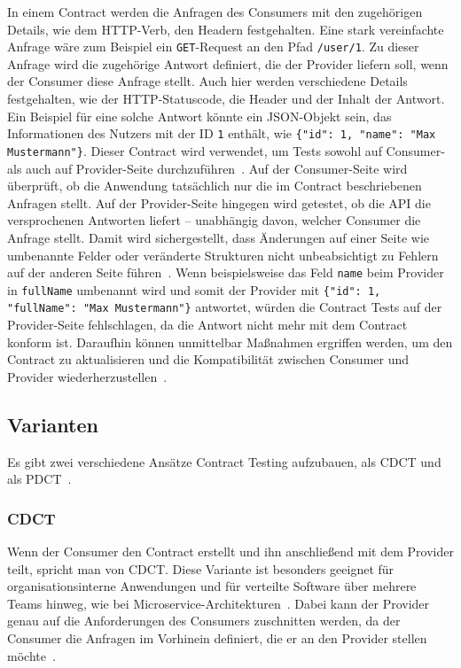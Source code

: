 In einem Contract werden die Anfragen des Consumers mit den zugehörigen Details, wie dem \gls{HTTP}-Verb, den Headern \usw festgehalten.
Eine stark vereinfachte Anfrage wäre zum Beispiel ein \texttt{GET}-Request an den Pfad \texttt{/user/1}.
Zu dieser Anfrage wird die zugehörige Antwort definiert, die der Provider liefern soll, wenn der Consumer diese Anfrage stellt.
Auch hier werden verschiedene Details festgehalten, wie der \gls{HTTP}-Statuscode, die Header und der Inhalt der Antwort.
Ein Beispiel für eine solche Antwort könnte ein \gls{JSON}-Objekt sein, das Informationen des Nutzers mit der ID \texttt{1} enthält, wie \zB \verb|{"id": 1, "name": "Max Mustermann"}|.
Dieser Contract wird verwendet, um Tests sowohl auf Consumer- als auch auf Provider-Seite durchzuführen~\cite{fowlerConsumerDrivenContractsService}.
Auf der Consumer-Seite wird überprüft, ob die Anwendung tatsächlich nur die im Contract beschriebenen Anfragen stellt.
Auf der Provider-Seite hingegen wird getestet, ob die \gls{API} die versprochenen Antworten liefert – unabhängig davon, welcher Consumer die Anfrage stellt.
Damit wird sichergestellt, dass Änderungen auf einer Seite wie \zB umbenannte Felder oder veränderte Strukturen nicht unbeabsichtigt zu Fehlern auf der anderen Seite führen~\cite{cruzContractTestingAction2025}.
Wenn  beispielsweise das Feld \texttt{name} beim Provider in \texttt{fullName} umbenannt wird
 und somit der Provider mit \verb|{"id": 1, "fullName": "Max Mustermann"}| antwortet, würden die Contract Tests auf der Provider-Seite fehlschlagen, da die Antwort nicht mehr mit dem Contract konform ist.
Daraufhin können unmittelbar Maßnahmen ergriffen werden, um den Contract zu aktualisieren und die Kompatibilität zwischen Consumer und Provider wiederherzustellen~\cite{morganTestingMicroservicesConsumerdriven2019}.

\subsection{Varianten}\label{subsec:foundation_contracttesting_variants}

Es gibt zwei verschiedene Ansätze Contract Testing aufzubauen, als \gls{CDCT} und als \gls{PDCT}~\cite{cruzContractTestingAction2025}.

\subsubsection{\glsdesc{CDCT}}

Wenn der Consumer den Contract erstellt und ihn anschließend mit dem Provider teilt, spricht man von \gls{CDCT}.
Diese Variante ist besonders geeignet für organisationsinterne Anwendungen und für verteilte Software über mehrere Teams hinweg, wie \zB bei Microservice-Architekturen~\cite{richardsonMicroservicesPatterns2018}.
Dabei kann der Provider genau auf die Anforderungen des Consumers zuschnitten werden, da der Consumer die Anfragen im Vorhinein definiert, die er an den Provider stellen möchte~\cite{cruzContractTestingAction2025}.

